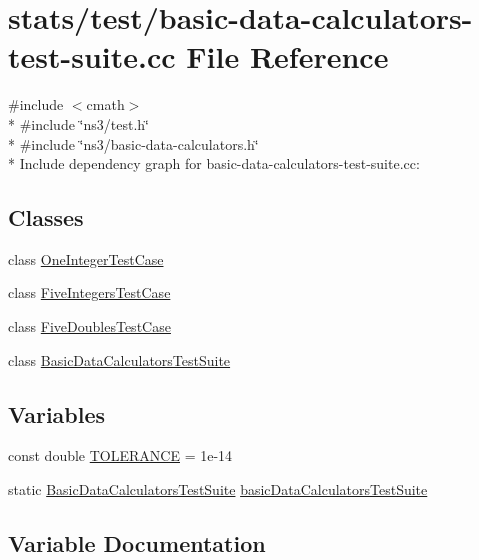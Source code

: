 \hypertarget{basic-data-calculators-test-suite_8cc}{}\section{stats/test/basic-\/data-\/calculators-\/test-\/suite.cc File Reference}
\label{basic-data-calculators-test-suite_8cc}
{\ttfamily \#include $<$cmath$>$}\\*
{\ttfamily \#include \char`\"{}ns3/test.\+h\char`\"{}}\\*
{\ttfamily \#include \char`\"{}ns3/basic-\/data-\/calculators.\+h\char`\"{}}\\*
Include dependency graph for basic-\/data-\/calculators-\/test-\/suite.cc\+:
\subsection*{Classes}
\begin{DoxyCompactItemize}
\item 
class \hyperlink{classOneIntegerTestCase}{One\+Integer\+Test\+Case}
\item 
class \hyperlink{classFiveIntegersTestCase}{Five\+Integers\+Test\+Case}
\item 
class \hyperlink{classFiveDoublesTestCase}{Five\+Doubles\+Test\+Case}
\item 
class \hyperlink{classBasicDataCalculatorsTestSuite}{Basic\+Data\+Calculators\+Test\+Suite}
\end{DoxyCompactItemize}
\subsection*{Variables}
\begin{DoxyCompactItemize}
\item 
const double \hyperlink{basic-data-calculators-test-suite_8cc_a89311a98397f9d6967d2cb10d5152d77}{T\+O\+L\+E\+R\+A\+N\+CE} = 1e-\/14
\item 
static \hyperlink{classBasicDataCalculatorsTestSuite}{Basic\+Data\+Calculators\+Test\+Suite} \hyperlink{basic-data-calculators-test-suite_8cc_a7842a97f187c5fa79dd56579240ad925}{basic\+Data\+Calculators\+Test\+Suite}
\end{DoxyCompactItemize}


\subsection{Variable Documentation}
